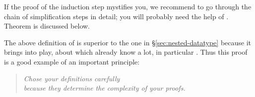 \begin{isabellebody}
\begin{isamarkuptext}
\noindent
If the proof of the induction step mystifies you, we recommend to go through
the chain of simplification steps in detail; you will probably need the help of
. Theorem  is discussed below.

The above definition of  is superior to the one in
\S\ref{sec:nested-datatype} because it brings  into play, about
which already know a lot, in particular .
Thus this proof is a good example of an important principle:
\begin{quote}
\emph{Chose your definitions carefully\\
because they determine the complexity of your proofs.}
\end{quote}


\end{isamarkuptext}
\end{isabellebody}
